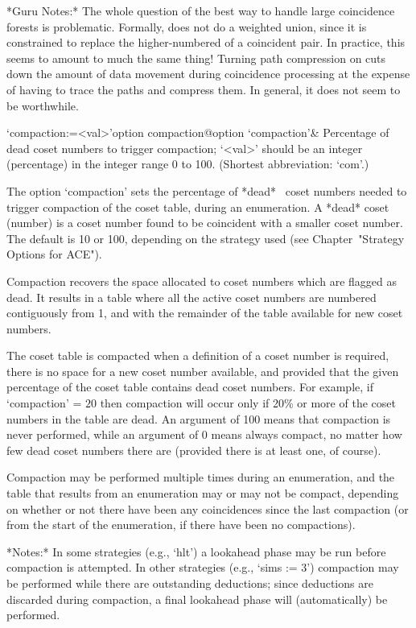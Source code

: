 *Guru Notes:*
The whole question of the best way to handle large coincidence forests
is problematic.  Formally, {\ACE} does  not do a weighted union, since
it is constrained to replace the higher-numbered of a coincident pair.
In practice,  this seems  to amount to  much the same  thing!  Turning
path  compression on  cuts down  the  amount of  data movement  during
coincidence processing at the expense of having to trace the paths and
compress them.  In general, it does not seem to be worthwhile.

\>`compaction:=<val>'{option compaction}@{option `compaction'}&
Percentage of dead coset numbers to trigger
compaction; `<val>' should be an integer (percentage) in  the  integer
range 0 to 100. (Shortest abbreviation: `com'.)

The option `compaction'  sets  the  percentage  of  *dead*~ coset numbers needed  to  trigger  compaction  of  the
coset table, during an enumeration. A *dead* coset (number) is a coset
number found to be coincident with a smaller coset number.  The
default  is  10  or  100,  depending  on  the   strategy   used   (see
Chapter~"Strategy Options for ACE").

Compaction recovers the space allocated to  coset  numbers  which  are
flagged as dead. It results in a table  where  all  the  active  coset
numbers are numbered contiguously from 1, and with  the  remainder  of
the table available for new coset numbers.

The coset table is compacted when a definition of a  coset  number  is
required, there is no space for a  new  coset  number  available,  and
provided that the given percentage of the coset  table  contains  dead
coset numbers. For example, if `compaction'  =  $20$  then  compaction
will occur only if 20\% or more of the coset numbers in the table  are
dead. An argument of 100 means that  compaction  is  never  performed,
while an argument of 0 means always compact, no matter  how  few  dead
coset numbers there are (provided there is at least one, of course).

Compaction may be performed  multiple times during an enumeration, and
the table that results from an  enumeration may or may not be compact,
depending on whether or not there have been any coincidences since the
last compaction (or  from the start of the  enumeration, if there have
been no compactions).

*Notes:*
In some strategies (e.g., `hlt') a lookahead phase may be  run  before
compaction is attempted. In  other  strategies  (e.g.,  `sims  :=  3')
compaction may be performed while there  are  outstanding  deductions;
since deductions are discarded during compaction,  a  final  lookahead
phase will (automatically) be performed.

